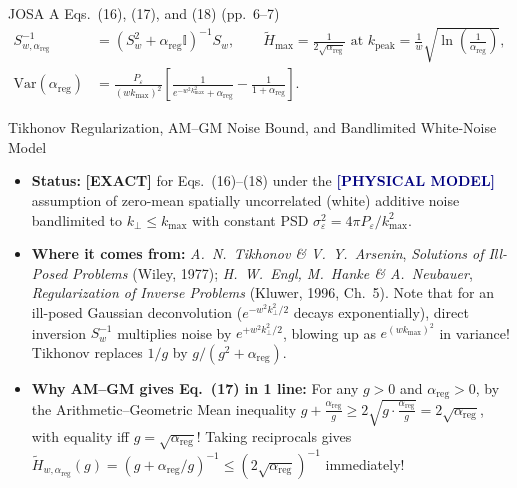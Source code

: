 \documentclass[10pt,letterpaper]{article}
\newcommand{\tagexact}{\textcolor{forest}{\textbf{[EXACT]}}}
\newcommand{\tagmodel}{\textcolor{navy}{\textbf{[PHYSICAL MODEL]}}}
\numberwithin{equation}{section}
\begin{document}
\begin{targeteq}{JOSA A Eqs.~(16), (17), and (18) (pp.~6--7)}
\begin{align*}
  S_{w,\alpha_{\mathrm{reg}}}^{-1} &= (S_w^2 + \alpha_{\mathrm{reg}}\mathbb{I})^{-1}S_w, \qquad
  \widetilde{H}_{\max} = \frac{1}{2\sqrt{\alpha_{\mathrm{reg}}}}\text{ at } k_{\mathrm{peak}} = \frac{1}{w}\sqrt{\ln\!\left(\frac{1}{\alpha_{\mathrm{reg}}}\right)}, \\
  \mathrm{Var}(\alpha_{\mathrm{reg}}) &= \frac{P_\varepsilon}{(wk_{\max})^2}\left[\frac{1}{e^{-w^2 k_{\max}^2}+\alpha_{\mathrm{reg}}} - \frac{1}{1+\alpha_{\mathrm{reg}}}\right].
\end{align*}
\end{targeteq}

\begin{approxbox}{Tikhonov Regularization, AM--GM Noise Bound, and Bandlimited White-Noise Model}
\begin{itemize}[leftmargin=1.4em,itemsep=2pt,topsep=1pt]
  \item \textbf{Status:} \tagexact{} for Eqs.~(16)--(18) under the \tagmodel{} assumption of zero-mean spatially uncorrelated (white) additive noise bandlimited to $k_\perp \le k_{\max}$ with constant PSD $\sigma_\varepsilon^2 = 4\pi P_\varepsilon/k_{\max}^2$.
  \item \textbf{Where it comes from:} \emph{A.\ N.\ Tikhonov \& V.\ Y.\ Arsenin}, \emph{Solutions of Ill-Posed Problems} (Wiley, 1977); \emph{H.\ W.\ Engl, M.\ Hanke \& A.\ Neubauer}, \emph{Regularization of Inverse Problems} (Kluwer, 1996, Ch.~5). Note that for an ill-posed Gaussian deconvolution ($e^{-w^2 k_\perp^2/2}$ decays exponentially), direct inversion $S_w^{-1}$ multiplies noise by $e^{+w^2 k_\perp^2/2}$, blowing up as $e^{(wk_{\max})^2}$ in variance! Tikhonov replaces $1/g$ by $g/(g^2 + \alpha_{\mathrm{reg}})$.
  \item \textbf{Why AM--GM gives Eq.~(17) in 1 line:} For any $g > 0$ and $\alpha_{\mathrm{reg}} > 0$, by the Arithmetic--Geometric Mean inequality $g + \frac{\alpha_{\mathrm{reg}}}{g} \ge 2\sqrt{g\cdot\frac{\alpha_{\mathrm{reg}}}{g}} = 2\sqrt{\alpha_{\mathrm{reg}}}$, with equality iff $g = \sqrt{\alpha_{\mathrm{reg}}}$! Taking reciprocals gives $\widetilde{H}_{w,\alpha_{\mathrm{reg}}}(g) = (g + \alpha_{\mathrm{reg}}/g)^{-1} \le (2\sqrt{\alpha_{\mathrm{reg}}})^{-1}$ immediately!
\end{itemize}
\end{approxbox}
\end{document}
